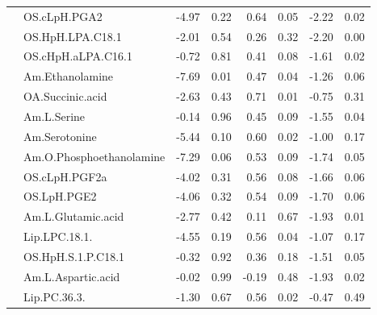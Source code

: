 \documentclass{amsart}
\begin{document}
\begin{table}
\begin{tabular}{clrrrrrr}
 & OS.cLpH.PGA2 & {\cellcolor[rgb]{0.886,0.651,0.663}}-4.97 & 0.22 & {\cellcolor[rgb]{0.863,0.922,0.82}}0.64 & 0.05 & {\cellcolor[rgb]{0.949,0.843,0.847}}-2.22 & 0.02 \\
 & OS.HpH.LPA.C18.1 & {\cellcolor[rgb]{0.953,0.859,0.863}}-2.01 & 0.54 & {\cellcolor[rgb]{0.945,0.969,0.929}}0.26 & 0.32 & {\cellcolor[rgb]{0.949,0.847,0.851}}-2.20 & 0.00 \\
 & OS.cHpH.aLPA.C16.1 & {\cellcolor[rgb]{0.98,0.949,0.949}}-0.72 & 0.81 & {\cellcolor[rgb]{0.914,0.949,0.886}}0.41 & 0.08 & {\cellcolor[rgb]{0.961,0.886,0.89}}-1.61 & 0.02 \\
 & Am.Ethanolamine & {\cellcolor[rgb]{0.827,0.463,0.478}}-7.69 & 0.01 & {\cellcolor[rgb]{0.898,0.941,0.867}}0.47 & 0.04 & {\cellcolor[rgb]{0.969,0.91,0.914}}-1.26 & 0.06 \\
 & OA.Succinic.acid & {\cellcolor[rgb]{0.941,0.816,0.82}}-2.63 & 0.43 & {\cellcolor[rgb]{0.847,0.914,0.804}}0.71 & 0.01 & {\cellcolor[rgb]{0.98,0.945,0.945}}-0.75 & 0.31 \\
 & Am.L.Serine & {\cellcolor[rgb]{0.996,0.988,0.988}}-0.14 & 0.96 & {\cellcolor[rgb]{0.906,0.945,0.875}}0.45 & 0.09 & {\cellcolor[rgb]{0.965,0.89,0.894}}-1.55 & 0.04 \\
 & Am.Serotonine & {\cellcolor[rgb]{0.878,0.62,0.631}}-5.44 & 0.10 & {\cellcolor[rgb]{0.871,0.925,0.831}}0.60 & 0.02 & {\cellcolor[rgb]{0.976,0.929,0.929}}-1.00 & 0.17 \\
 & Am.O.Phosphoethanolamine & {\cellcolor[rgb]{0.835,0.49,0.506}}-7.29 & 0.06 & {\cellcolor[rgb]{0.886,0.937,0.855}}0.53 & 0.09 & {\cellcolor[rgb]{0.961,0.878,0.882}}-1.74 & 0.05 \\
 & OS.cLpH.PGF2a & {\cellcolor[rgb]{0.91,0.718,0.725}}-4.02 & 0.31 & {\cellcolor[rgb]{0.878,0.933,0.843}}0.56 & 0.08 & {\cellcolor[rgb]{0.961,0.882,0.886}}-1.66 & 0.06 \\
 & OS.LpH.PGE2 & {\cellcolor[rgb]{0.91,0.718,0.722}}-4.06 & 0.32 & {\cellcolor[rgb]{0.882,0.933,0.851}}0.54 & 0.09 & {\cellcolor[rgb]{0.961,0.878,0.882}}-1.70 & 0.06 \\
 & Am.L.Glutamic.acid & {\cellcolor[rgb]{0.937,0.804,0.812}}-2.77 & 0.42 & {\cellcolor[rgb]{0.976,0.988,0.969}}0.11 & 0.67 & {\cellcolor[rgb]{0.957,0.863,0.867}}-1.93 & 0.01 \\
 & Lip.LPC.18.1. & {\cellcolor[rgb]{0.898,0.682,0.69}}-4.55 & 0.19 & {\cellcolor[rgb]{0.878,0.933,0.847}}0.56 & 0.04 & {\cellcolor[rgb]{0.973,0.922,0.925}}-1.07 & 0.17 \\
 & OS.HpH.S.1.P.C18.1 & {\cellcolor[rgb]{0.992,0.976,0.976}}-0.32 & 0.92 & {\cellcolor[rgb]{0.925,0.957,0.902}}0.36 & 0.18 & {\cellcolor[rgb]{0.965,0.894,0.894}}-1.51 & 0.05 \\
 & Am.L.Aspartic.acid & {\cellcolor[rgb]{0.996,0.996,0.996}}-0.02 & 0.99 & {\cellcolor[rgb]{0.992,0.984,0.984}}-0.19 & 0.48 & {\cellcolor[rgb]{0.957,0.863,0.867}}-1.93 & 0.02 \\
 & Lip.PC.36.3. & {\cellcolor[rgb]{0.969,0.91,0.91}}-1.30 & 0.67 & {\cellcolor[rgb]{0.878,0.933,0.843}}0.56 & 0.02 & {\cellcolor[rgb]{0.988,0.965,0.965}}-0.47 & 0.49 \\ \bottomrule
\end{tabular}
\end{table}
\end{document}
